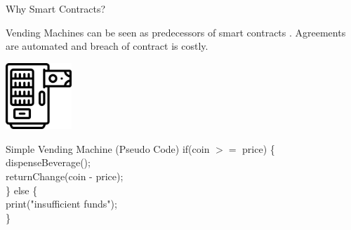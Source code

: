 \documentclass[handout]{beamer}
\begin{document}
\begin{frame}{Why Smart Contracts?}

Vending Machines can be seen as predecessors of smart contracts \cite{NS:94,NS:97}. Agreements are automated and breach of contract is costly.

\vspace{0.5em}

\begin{minipage}{0.4\textwidth}
	\vspace{0.5em}
	\centering
	\includegraphics[width=2.5cm]{../assets/images/vendingmachine.png}
\end{minipage}
\begin{minipage}{0.55\textwidth}
	\begin{samplecode}{Simple Vending Machine (Pseudo Code)}
		if(coin $>=$ price) \{ \\
			\tab dispenseBeverage(); \\
			\tab returnChange(coin - price);\\
		\} else \{ \\
			\tab print("insufficient funds"); \\
		\}
	\end{samplecode}	
\end{minipage}



\end{frame}
\end{document}
